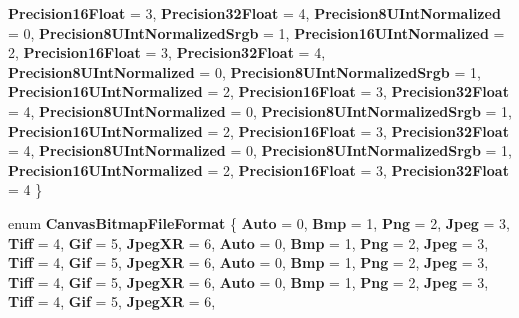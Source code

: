 \begin{DoxyCompactItemize}
{\bfseries Precision16\+Float} = 3, 
\newline
{\bfseries Precision32\+Float} = 4, 
{\bfseries Precision8\+U\+Int\+Normalized} = 0, 
{\bfseries Precision8\+U\+Int\+Normalized\+Srgb} = 1, 
{\bfseries Precision16\+U\+Int\+Normalized} = 2, 
\newline
{\bfseries Precision16\+Float} = 3, 
{\bfseries Precision32\+Float} = 4, 
{\bfseries Precision8\+U\+Int\+Normalized} = 0, 
{\bfseries Precision8\+U\+Int\+Normalized\+Srgb} = 1, 
\newline
{\bfseries Precision16\+U\+Int\+Normalized} = 2, 
{\bfseries Precision16\+Float} = 3, 
{\bfseries Precision32\+Float} = 4, 
{\bfseries Precision8\+U\+Int\+Normalized} = 0, 
\newline
{\bfseries Precision8\+U\+Int\+Normalized\+Srgb} = 1, 
{\bfseries Precision16\+U\+Int\+Normalized} = 2, 
{\bfseries Precision16\+Float} = 3, 
{\bfseries Precision32\+Float} = 4, 
\newline
{\bfseries Precision8\+U\+Int\+Normalized} = 0, 
{\bfseries Precision8\+U\+Int\+Normalized\+Srgb} = 1, 
{\bfseries Precision16\+U\+Int\+Normalized} = 2, 
{\bfseries Precision16\+Float} = 3, 
\newline
{\bfseries Precision32\+Float} = 4
 \}
\item 
\mbox{\label{namespace_microsoft_1_1_graphics_1_1_canvas_a912d98ef415ce79b96eeb1280290df73}} 
enum {\bfseries Canvas\+Bitmap\+File\+Format} \{ \newline
{\bfseries Auto} = 0, 
{\bfseries Bmp} = 1, 
{\bfseries Png} = 2, 
{\bfseries Jpeg} = 3, 
\newline
{\bfseries Tiff} = 4, 
{\bfseries Gif} = 5, 
{\bfseries Jpeg\+XR} = 6, 
{\bfseries Auto} = 0, 
\newline
{\bfseries Bmp} = 1, 
{\bfseries Png} = 2, 
{\bfseries Jpeg} = 3, 
{\bfseries Tiff} = 4, 
\newline
{\bfseries Gif} = 5, 
{\bfseries Jpeg\+XR} = 6, 
{\bfseries Auto} = 0, 
{\bfseries Bmp} = 1, 
\newline
{\bfseries Png} = 2, 
{\bfseries Jpeg} = 3, 
{\bfseries Tiff} = 4, 
{\bfseries Gif} = 5, 
\newline
{\bfseries Jpeg\+XR} = 6, 
{\bfseries Auto} = 0, 
{\bfseries Bmp} = 1, 
{\bfseries Png} = 2, 
\newline
{\bfseries Jpeg} = 3, 
{\bfseries Tiff} = 4, 
{\bfseries Gif} = 5, 
{\bfseries Jpeg\+XR} = 6, 
\newline

\end{DoxyCompactItemize}
